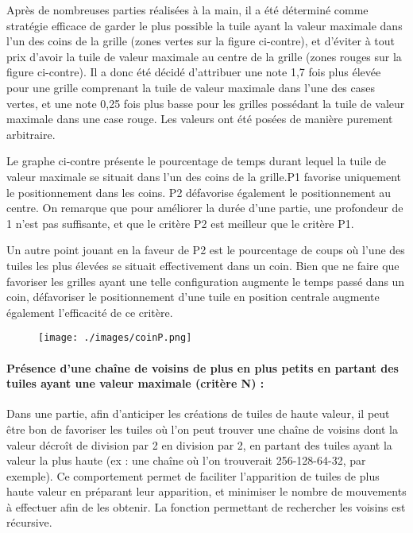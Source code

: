 \documentclass[a4paper]{report}
\begin{document}
Après de nombreuses parties réalisées à la main, il a été déterminé comme stratégie efficace de garder le plus possible la tuile ayant la valeur maximale dans l’un des coins de la grille (zones vertes sur la figure ci-contre), et d’éviter à tout prix d’avoir la tuile de valeur maximale au centre de la grille (zones rouges sur la figure ci-contre). Il a donc été décidé d’attribuer une note 1,7 fois plus élevée pour une grille comprenant la tuile de valeur maximale dans l’une des cases vertes, et une note 0,25 fois plus basse pour les grilles possédant la tuile de valeur maximale dans une case rouge. Les valeurs ont été posées de manière purement arbitraire.
\newpage

\begin{figure}[h!]
\null\hfill
{}
\hfill
{}
\hfill\null
\end{figure}

Le graphe ci-contre présente le pourcentage de temps durant lequel la tuile de valeur maximale se situait dans l’un des coins de la grille.P1 favorise uniquement le positionnement dans les coins. P2 défavorise également le positionnement au centre. On remarque que pour améliorer la durée d’une partie, une profondeur de 1 n’est pas suffisante, et que le critère P2 est meilleur que le critère P1.

Un autre point jouant en la faveur de P2 est le pourcentage de coups où l’une des tuiles les plus élevées se situait effectivement dans un coin. Bien que ne faire que favoriser les grilles ayant une telle configuration augmente le temps passé dans un coin, défavoriser le positionnement d’une tuile en position centrale augmente également l’efficacité de ce critère.



\begin{figure}[h]
\begin{center}
\texttt{[image: ./images/coinP.png]}
\end{center}
\end{figure}


\paragraph{Présence d’une chaîne de voisins de plus en plus petits en partant des tuiles ayant une valeur maximale (critère N) :}
Dans une partie, afin d’anticiper les créations de tuiles de haute valeur, il peut être bon de favoriser les tuiles où l’on peut trouver une chaîne de voisins dont la valeur décroît de division par 2 en division par 2, en partant des tuiles ayant la valeur la plus haute (ex : une chaîne où l’on trouverait 256-128-64-32, par exemple). Ce comportement permet de faciliter l’apparition de tuiles de plus haute valeur en préparant leur apparition, et minimiser le nombre de mouvements à effectuer afin de les obtenir. La fonction permettant de rechercher les voisins est récursive.
\end{document}
